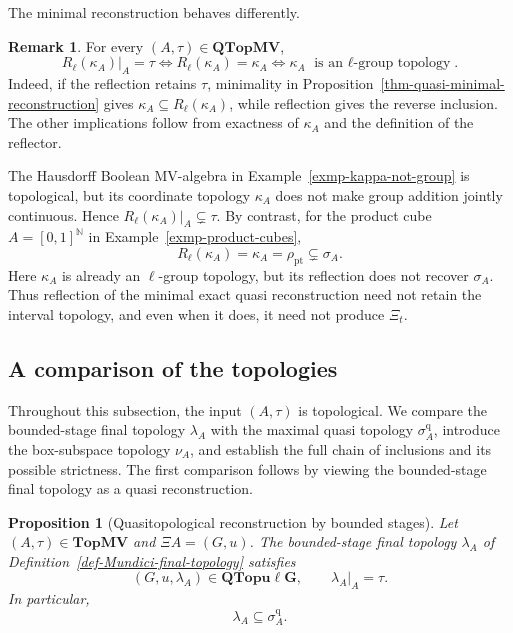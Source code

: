 \documentclass[preprint,3p]{elsarticle}
\theoremstyle{plain}
\newtheorem{prop}[thm]{Proposition}
\theoremstyle{definition}
\newtheorem{rem}[thm]{Remark}
\newcommand{\TopMV}{\mathbf{TopMV}}
\newcommand{\QTopMV}{\mathbf{QTopMV}}
\newcommand{\QTopulg}{\mathbf{QTopu\ell G}}
\numberwithin{equation}{section}
\begin{document}
The minimal reconstruction behaves differently.

\begin{rem}
\label{rem-minimal-quasi-reflection}
For every $(A,\tau)\in\QTopMV$,
\begin{equation}
\label{eq-minimal-quasi-reflection}
 R_\ell(\kappa_A)|_A=\tau
 \iff R_\ell(\kappa_A)=\kappa_A
 \iff \kappa_A\text{ is an $\ell$-group topology}.
\end{equation}
Indeed, if the reflection retains $\tau$, minimality in
Proposition~\ref{thm-quasi-minimal-reconstruction} gives
$\kappa_A\subseteq R_\ell(\kappa_A)$, while reflection gives the
reverse inclusion.  The other implications follow from exactness
of $\kappa_A$ and the definition of the reflector.

The Hausdorff Boolean MV-algebra in
Example~\ref{exmp-kappa-not-group} is topological, but its
coordinate topology $\kappa_A$ does not make group addition
jointly continuous.  Hence
$R_\ell(\kappa_A)|_A\subsetneq\tau$.
By contrast, for the product cube $A=[0,1]^{\mathbb N}$ in
Example~\ref{exmp-product-cubes},
\[
 R_\ell(\kappa_A)=\kappa_A=\rho_{\mathrm{pt}}\subsetneq\sigma_A.
\]
Here $\kappa_A$ is already an $\ell$-group topology, but its
reflection does not recover $\sigma_A$.
Thus reflection of the minimal exact quasi reconstruction need not
retain the interval topology, and even when it does, it need not
produce $\Xi_t$.
\end{rem}

\subsection{A comparison of the topologies}
\label{sec-quasi-topological-reflection}

Throughout this subsection, the input $(A,\tau)$ is topological.
We compare the bounded-stage final topology $\lambda_A$ with
the maximal quasi topology $\sigma_A^{\mathrm q}$, introduce
the box-subspace topology $\nu_A$, and establish the full chain
of inclusions and its possible strictness.
The first comparison follows by viewing the bounded-stage final
topology as a quasi reconstruction.

\begin{prop}[Quasitopological reconstruction by bounded stages]
\label{prop-lambda-quasi-reconstruction}
Let $(A,\tau)\in\TopMV$ and $\Xi A=(G,u)$.
The bounded-stage final topology $\lambda_A$ of
Definition~\ref{def-Mundici-final-topology} satisfies
\[
 (G,u,\lambda_A)\in\QTopulg,
 \qquad \lambda_A|_A=\tau.
\]
In particular,
\begin{equation}
\label{eq-lambda-quasi-comparison}
 \lambda_A\subseteq\sigma_A^{\mathrm q}.
\end{equation}
\end{prop}
\end{document}
